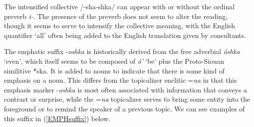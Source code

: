 The intensified collective /-sha-shka/ can appear with or without the ordinal preverb \textit{i-}. The presence of the preverb does not seem to alter the reading, though it seems to serve to intensify the collective meaning, with the English quantifier `all' often being added to the English translation given by consultants.

\label{emphaticsuffix}

The emphatic suffix -\textit{oshka} is historically derived from the free adverbial \textit{óshka} `even', which itself seems to be composed of \textit{ó'} `be' plus the Proto-Siouan similitive *ska. It is added to nouns to indicate that there is some kind of emphasis on a noun. This differs from the topicalizer enclitic =\textit{na} in that this emphasis marker -\textit{oshka} is most often associated with information that conveys a contrast or surprise, while the =\textit{na} topicalizer serves to bring some entity into the foreground or to remind the speaker of a previous topic. We can see examples of this suffix in (\ref{EMPHsuffix}) below.


